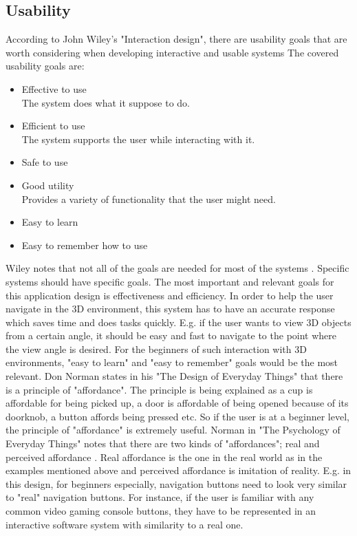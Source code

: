 \subsection{Usability}
\label{Usability}

According to John Wiley's "Interaction design", there are usability goals that are worth considering when developing interactive and usable systems \cite{Wileys} The covered usability goals are:

\begin{itemize}
\item Effective to use\\
The system does what it suppose to do.
\item Efficient to use\\
The system supports the user while interacting	
with it.
\item Safe to use
\item Good utility \\
Provides a variety of functionality that the user might need.
\item Easy to learn
\item Easy to remember how to use
\end{itemize}


Wiley notes that not all of the goals are needed for most of the systems \cite{Wileys}. Specific systems should have specific goals. The most important and relevant goals for this application design is effectiveness and efficiency. In order to help the user navigate in the 3D environment, this system has to have an accurate response which saves time and does tasks quickly. E.g. if the user wants to view 3D objects from a certain angle, it should be easy and fast to navigate to the point where the view angle is desired. For the beginners of such interaction with 3D environments, "easy to learn" and "easy to remember" goals would be the most relevant. Don Norman states in his "The Design of Everyday Things" that there is a principle of "affordance". \cite{Normans} The principle is being explained as a cup is affordable for being picked up, a door is affordable of being opened because of its doorknob, a button affords being pressed etc. So if the user is at a beginner level, the principle of "affordance" is extremely useful. Norman in "The Psychology of Everyday Things" notes that there are two kinds of "affordances"; real and perceived affordance \cite{Affordance}. Real affordance is the one in the real world as in the examples mentioned above and perceived affordance is imitation of reality. E.g. in this design, for beginners especially, navigation buttons need to look very similar to "real" navigation buttons. For instance, if the user is familiar with any common video gaming console buttons, they have to be represented in an interactive software system with similarity to a real one. 


